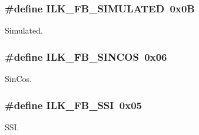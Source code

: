 \subsubsection[{\texorpdfstring{I\+L\+K\+\_\+\+F\+B\+\_\+\+S\+I\+M\+U\+L\+A\+T\+ED}{ILK_FB_SIMULATED}}]{\setlength{\rightskip}{0pt plus 5cm}\#define I\+L\+K\+\_\+\+F\+B\+\_\+\+S\+I\+M\+U\+L\+A\+T\+ED~0x0B}\hypertarget{group__IL__CONST__FB_gaa3a26923923455feb238d74ec5d64a3c}{}\label{group__IL__CONST__FB_gaa3a26923923455feb238d74ec5d64a3c}


Simulated. 

\subsubsection[{\texorpdfstring{I\+L\+K\+\_\+\+F\+B\+\_\+\+S\+I\+N\+C\+OS}{ILK_FB_SINCOS}}]{\setlength{\rightskip}{0pt plus 5cm}\#define I\+L\+K\+\_\+\+F\+B\+\_\+\+S\+I\+N\+C\+OS~0x06}\hypertarget{group__IL__CONST__FB_ga06e050308174827bf2f5de8c1fb18340}{}\label{group__IL__CONST__FB_ga06e050308174827bf2f5de8c1fb18340}


Sin\+Cos. 

\subsubsection[{\texorpdfstring{I\+L\+K\+\_\+\+F\+B\+\_\+\+S\+SI}{ILK_FB_SSI}}]{\setlength{\rightskip}{0pt plus 5cm}\#define I\+L\+K\+\_\+\+F\+B\+\_\+\+S\+SI~0x05}\hypertarget{group__IL__CONST__FB_ga9874ed60d637b9bf51850678add98685}{}\label{group__IL__CONST__FB_ga9874ed60d637b9bf51850678add98685}


S\+SI. 

